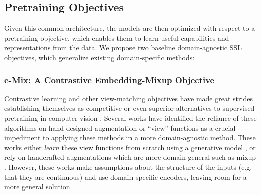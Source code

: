 \documentclass{article}
\begin{document}
\subsection{Pretraining Objectives}
Given this common architecture, the models are then optimized with respect to a pretraining objective, which enables them to learn useful capabilities and representations from the data. We propose two baseline domain-agnostic SSL objectives, which generalize existing domain-specific methods:

\subsubsection{e-Mix: A Contrastive Embedding-Mixup Objective}
Contrastive learning and other view-matching objectives have made great strides establishing themselves as competitive or even superior alternatives to supervised pretraining in computer vision \citep{Wu2018UnsupervisedFL, Chen2020ASF, He2020MomentumCF, Grill2020BootstrapYO}. Several works have identified the reliance of these algorithms on hand-designed augmentation or ``view'' functions as a crucial impediment to applying these methods in a more domain-agnostic method. These works either \emph{learn} these view functions from scratch using a generative model \citep{Tamkin2020ViewmakerNL}, or rely on handcrafted augmentations which are more domain-general such as mixup \citep{Lee2021iMIXAD, Verma2020TowardsDC}. However, these works make assumptions about the structure of the inputs (e.g. that they are continuous) and use domain-specific encoders, leaving room for a more general solution.
\end{document}
